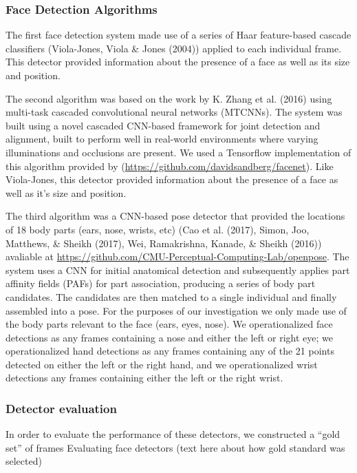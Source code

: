 \documentclass[10pt, letterpaper]{article}
\begin{document}
\subsubsection{Face Detection
Algorithms}\label{face-detection-algorithms}

The first face detection system made use of a series of Haar
feature-based cascade classifiers (Viola-Jones, Viola \& Jones (2004))
applied to each individual frame. This detector provided information
about the presence of a face as well as its size and position.

The second algorithm was based on the work by K. Zhang et al. (2016)
using multi-task cascaded convolutional neural networks (MTCNNs). The
system was built using a novel cascaded CNN-based framework for joint
detection and alignment, built to perform well in real-world
environments where varying illuminations and occlusions are present. We
used a Tensorflow implementation of this algorithm provided by
(\url{https://github.com/davidsandberg/facenet}). Like Viola-Jones, this
detector provided information about the presence of a face as well as
it's size and position.

The third algorithm was a CNN-based pose detector that provided the
locations of 18 body parts (ears, nose, wrists, etc) (Cao et al. (2017),
Simon, Joo, Matthews, \& Sheikh (2017), Wei, Ramakrishna, Kanade, \&
Sheikh (2016)) avaliable at
\url{https://github.com/CMU-Perceptual-Computing-Lab/openpose}. The
system uses a CNN for initial anatomical detection and subsequently
applies part affinity fields (PAFs) for part association, producing a
series of body part candidates. The candidates are then matched to a
single individual and finally assembled into a pose. For the purposes of
our investigation we only made use of the body parts relevant to the
face (ears, eyes, nose). We operationalized face detections as any
frames containing a nose and either the left or right eye; we
operationalized hand detections as any frames containing any of the 21
points detected on either the left or the right hand, and we
operationalized wrist detections any frames containing either the left
or the right wrist.

\subsubsection{Detector evaluation}\label{detector-evaluation}

In order to evaluate the performance of these detectors, we constructed
a ``gold set'' of frames Evaluating face detectors (text here about how
gold standard was selected)
\end{document}
